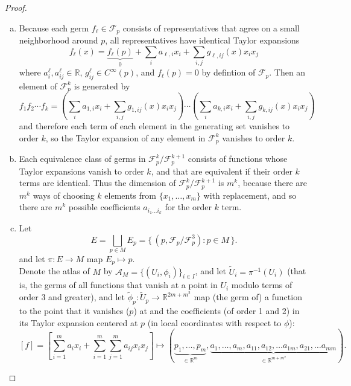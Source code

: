 \documentclass{article}
\begin{document}
\begin{proof} $ $
  \begin{enumerate}[(a)]
    \item
      Because each germ $f_\ell \in \mathcal{F}_p$ consists of representatives that
      agree on a small neighborhood around $p$, all representatives have
      identical Taylor expansions \[
        f_\ell(x) = \underbrace{f_\ell(p)}_0 + \sum_i a_{\ell,i} x_i
          + \sum_{i,j} g_{\ell,ij}(x) x_i x_j
      \] where
      $a^\ell_i, a^\ell_{ij} \in \mathbb{R}$, $g^\ell_{ij} \in C^\infty(p)$, and
      $f_\ell(p) = 0$ by defintion of $\mathcal{F}_p$.
      Then an element of $\mathcal{F}_p^k$ is generated by \[
        f_1 f_2 \cdots f_k =
          \left(\sum_i a_{1,i} x_i + \sum_{i,j} g_{1,ij}(x) x_i x_j\right) \cdots
          \left(\sum_i a_{k,i} x_i + \sum_{i,j} g_{k,ij}(x) x_i x_j\right)
      \] and therefore each term of each element in the generating set vanishes
      to order $k$, so the Taylor expansion of any element in $\mathcal{F}_p^k$
      vanishes to order $k$.
    \item Each equivalence class of germs in
      $\mathcal{F}_p^k/\mathcal{F}_p^{k+1}$ consists of functions whose Taylor
      expansions vanish to order $k$, and that are equivalent if their order $k$
      terms are identical.
      Thus the dimension of $\mathcal{F}_p^k/\mathcal{F}_p^{k+1}$ is $m^k$,
      because there are $m^k$ ways of choosing $k$ elements from
      $\{ x_1, \hdots, x_m \}$ with replacement, and so there are $m^k$ possible
      coefficients $a_{i_1 \hdots i_k}$ for the order $k$ term.
    \item
      Let \[
        E = \bigsqcup_{p \in M} E_p
          = \{\, (p, \mathcal{F}_p/\mathcal{F}_p^3) : p \in M \,\}.
      \] and let $\pi: E \rightarrow M$ map $E_p \mapsto p$.
      \\
      Denote the atlas of $M$ by $\mathcal{A}_M = \{ (U_i, \phi_i) \}_{i \in I}$,
      and let $\widetilde{U}_i = \pi^{-1}(U_i)$ (that is, the germs of all
      functions that vanish at a point in $U_i$ modulo terms of order 3 and
      greater), and let
      $\widetilde{\phi}_p: \widetilde{U}_p \rightarrow \mathbb{R}^{2m + m^2}$ map
      (the germ of) a function to the point that it vanishes ($p$) at and the
      coefficients (of order 1 and 2) in its Taylor expansion centered at $p$
      (in local coordinates with respect to $\phi$):
      \[
        [f] = \left[
          \sum_{i=1}^m a_i x_i + \sum_{i=1}^m\sum_{j=1}^m a_{ij} x_i x_j
        \right] \mapsto
        (\underbrace{p_1, \hdots, p_m}_{\in \mathbb{R}^m}, \underbrace{
        a_1, \hdots, a_m, a_{11}, a_{12}, \hdots a_{1m}, a_{21}, \hdots a_{mm}
        }_{\in \mathbb{R}^{m + m^2}}).
      \]
  \end{enumerate}
\end{proof}
\end{document}
